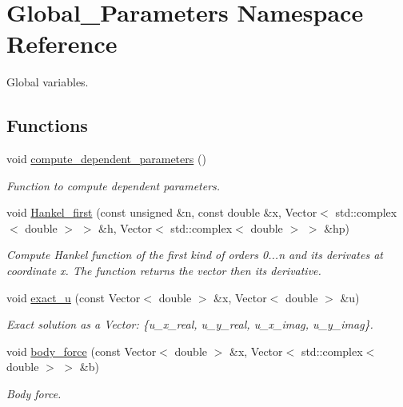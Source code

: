 \hypertarget{namespaceGlobal__Parameters}{}\section{Global\+\_\+\+Parameters Namespace Reference}
\label{namespaceGlobal__Parameters}


Global variables.  


\subsection*{Functions}
\begin{DoxyCompactItemize}
\item 
void \hyperlink{namespaceGlobal__Parameters_aafb6ae2e2642a42a7c8ce999837d18b1}{compute\+\_\+dependent\+\_\+parameters} ()
\begin{DoxyCompactList}\small\item\em Function to compute dependent parameters. \end{DoxyCompactList}\item 
void \hyperlink{namespaceGlobal__Parameters_a28ae8c02f7e4ef9d552591d22f1c26f9}{Hankel\+\_\+first} (const unsigned \&n, const double \&x, Vector$<$ std\+::complex$<$ double $>$ $>$ \&h, Vector$<$ std\+::complex$<$ double $>$ $>$ \&hp)
\begin{DoxyCompactList}\small\item\em Compute Hankel function of the first kind of orders 0...n and its derivates at coordinate x. The function returns the vector then its derivative. \end{DoxyCompactList}\item 
void \hyperlink{namespaceGlobal__Parameters_a97162dba4bd29a15067b9c9bbe53c754}{exact\+\_\+u} (const Vector$<$ double $>$ \&x, Vector$<$ double $>$ \&u)
\begin{DoxyCompactList}\small\item\em Exact solution as a Vector\+: \{u\+\_\+x\+\_\+real, u\+\_\+y\+\_\+real, u\+\_\+x\+\_\+imag, u\+\_\+y\+\_\+imag\}. \end{DoxyCompactList}\item 
void \hyperlink{namespaceGlobal__Parameters_a1db5d755b9fc9faa6cd74f4747264acc}{body\+\_\+force} (const Vector$<$ double $>$ \&x, Vector$<$ std\+::complex$<$ double $>$ $>$ \&b)
\begin{DoxyCompactList}\small\item\em Body force. \end{DoxyCompactList}\end{DoxyCompactItemize}
